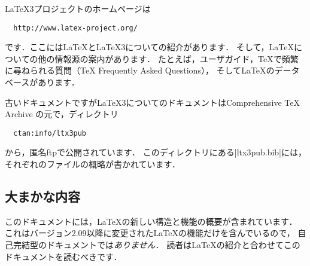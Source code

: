 \documentclass{ltxguide}[2001/05/28]
\begin{document}
\LaTeX3{}プロジェクトのホームページは
\begin{verbatim}
  http://www.latex-project.org/
\end{verbatim}
です．ここには\LaTeX{}と\LaTeX3{}についての紹介があります．
そして，\LaTeX{}についての他の情報源の案内があります．
たとえば，ユーザガイド，\TeX{}で頻繁に尋ねられる質問（\TeX{} Frequently Asked Questions），
そして\LaTeX{}のデータベースがあります．

古いドキュメントですが\LaTeX3{}についてのドキュメントはComprehensive \TeX{} Archive
の元で，ディレクトリ
\begin{verbatim}
  ctan:info/ltx3pub
\end{verbatim}
から，匿名ftpで公開されています．
このディレクトリにある|ltx3pub.bib|には，それぞれのファイルの概略が書かれています．


\subsection{大まかな内容}

このドキュメントには，\LaTeX{}の新しい構造と機能の概要が含まれています．
これはバージョン2.09以降に変更された\LaTeX{}の機能だけを含んでいるので，
自己完結型のドキュメントでは\emph{ありません}．
読者は\LaTeX{}の紹介と合わせてこのドキュメントを読むべきです．
\end{document}
